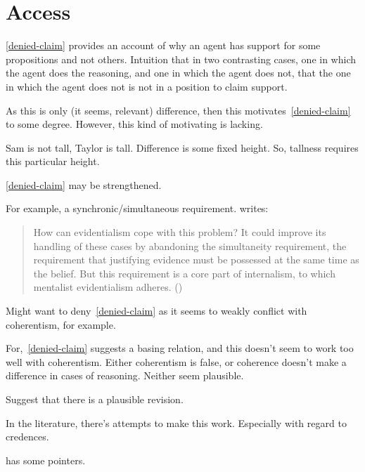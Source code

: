 \chapter{Access}
\label{cha:access}



\begin{note}
  \ref{denied-claim} provides an account of why an agent has support for some propositions and not others.
  Intuition that in two contrasting cases, one in which the agent does the reasoning, and one in which the agent does not, that the one in which the agent does not is not in a position to claim support.

  As this is only (it seems, relevant) difference, then this motivates~\ref{denied-claim} to some degree.
  However, this kind of motivating is lacking.

  Sam is not tall, Taylor is tall.
  Difference is some fixed height.
  So, tallness requires this particular height.
\end{note}

\begin{note}
  \ref{denied-claim} may be strengthened.

  For example, a synchronic/simultaneous requirement.
  \citeauthor{Goldman:2011vn} writes:
  \begin{quote}
    How can evidentialism cope with this problem? It could improve its handling of these cases by abandoning the simultaneity requirement, the requirement that justifying evidence must be possessed at the same time as the belief. But this requirement is a core part of internalism, to which mentalist evidentialism adheres.\nolinebreak
    \mbox{}\hfill\mbox{(\citeyear[261]{Goldman:2011vn})}
  \end{quote}
\end{note}

\begin{note}
  Might want to deny~\ref{denied-claim} as it seems to weakly conflict with coherentism, for example.

  For,~\ref{denied-claim} suggests a basing relation, and this doesn't seem to work too well with coherentism.
  Either coherentism is false, or coherence doesn't make a difference in cases of reasoning.
  Neither seem plausible.

  Suggest that there is a plausible revision.

  In the literature, there's attempts to make this work.
  Especially with regard to credences.

  \textcite[\S2]{Silva:2020aa} has some pointers.
\end{note}

